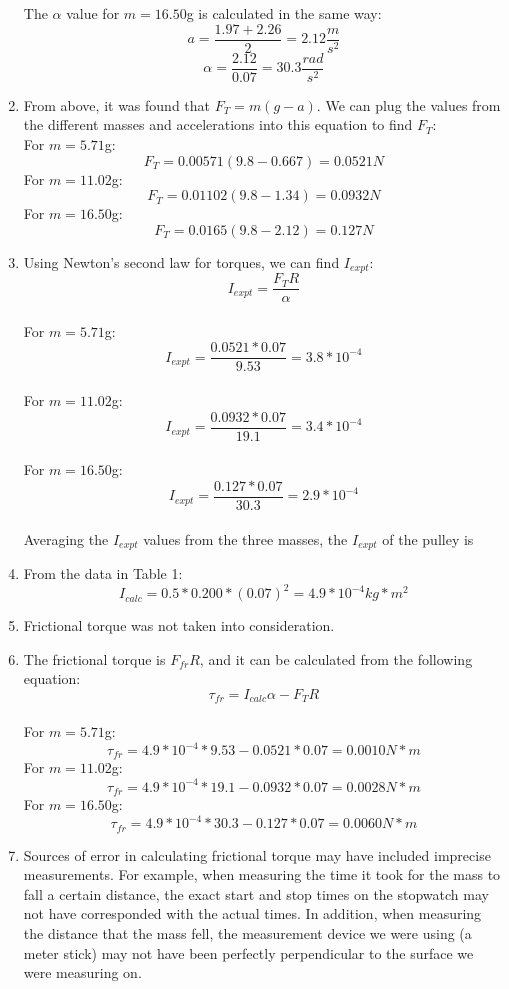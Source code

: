\documentclass[10pt, letterpaper]{article}
\begin{document}
\begin{enumerate}
      The $\alpha $ value for $m = 16.50$g is calculated in the same way: \\[3]
      \[ a = \frac{1.97 + 2.26}{2} = 2.12 \frac{m}{s^2} \]
      \[\alpha = \frac{2.12}{0.07} = \boxed{30.3 \frac{rad}{s^2}} \]
  \item From above, it was found that $F_T = m(g-a)$. We can plug the values from the different masses and accelerations into this equation to find $F_T$: \\
    For $m = 5.71$g:
      \[ F_T = 0.00571(9.8 - 0.667) = \boxed{0.0521 N} \]
    For $m = 11.02$g:
      \[ F_T = 0.01102(9.8 - 1.34) = \boxed{0.0932 N} \]
    For $m = 16.50$g:
      \[ F_T = 0.0165(9.8 - 2.12) =  \boxed{0.127 N} \]
  \item Using Newton's second law for torques, we can find $I_{expt}$:
    \[ I_{expt} = \frac{F_{T}R}{\alpha } \] \\
    For $m = 5.71$g:
      \[ I_{expt} = \frac{0.0521*0.07}{9.53} = 3.8 * 10^{-4} \] \\
    For $m = 11.02$g:
      \[ I_{expt} = \frac{0.0932*0.07}{19.1} = 3.4 * 10^{-4}\] \\
    For $m = 16.50$g:
      \[ I_{expt} = \frac{0.127*0.07}{30.3} = 2.9 * 10^{-4} \] \\
    Averaging the $I_{expt}$ values from the three masses, the $I_{expt}$ of the pulley is 
  \item From the data in Table 1:
      \[I_{calc} = 0.5*0.200*(0.07)^2 = \boxed{4.9 * 10^{-4} kg*m^2} \]
  \item Frictional torque was not taken into consideration.
  \item The frictional torque is $F_{fr}R$, and it can be calculated from the following equation:
    \[ \tau _{fr} = I_{calc}\alpha - F_{T}R \] \\
    For $m = 5.71$g:
      \[ \tau _{fr} = 4.9*10^{-4}*9.53 - 0.0521*0.07 = \boxed{0.0010 N*m} \]
    For $m = 11.02$g:
      \[ \tau _{fr} = 4.9*10^{-4}*19.1 - 0.0932*0.07 = \boxed{0.0028 N*m} \]
    For $m = 16.50$g:
      \[ \tau _{fr} = 4.9*10^{-4}*30.3 - 0.127*0.07 = \boxed{0.0060 N*m} \]
  \item Sources of error in calculating frictional torque may have included imprecise measurements. For example, when measuring the time
        it took for the mass to fall a certain distance, the exact start and stop times on the stopwatch may not have corresponded with the
        actual times. In addition, when measuring the distance that the mass fell, the measurement device we were using (a meter stick) may
        not have been perfectly perpendicular to the surface we were measuring on.
\end{enumerate}
\end{document}
